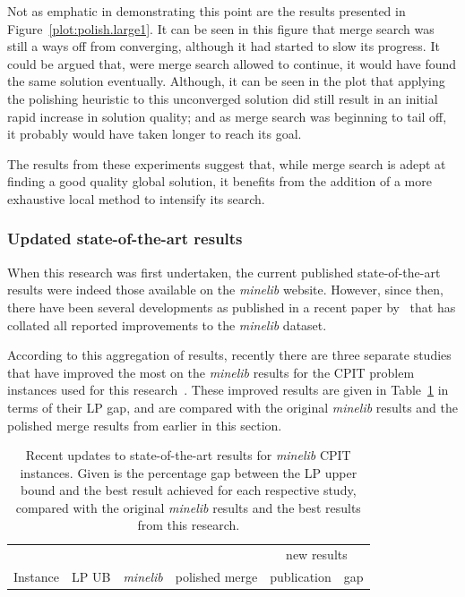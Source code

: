 \documentclass[authoryear,11pt,square,number,times,super,comma]{elsarticle}
\begin{document}
Not as emphatic in demonstrating this point are the results presented in Figure~\ref{plot:polish.large1}. It can be seen in this figure that merge search was still a ways off from converging, although it had started to slow its progress. It could be argued that, were merge search allowed to continue, it would have found the same solution eventually. Although, it can be seen in the plot that applying the polishing heuristic to this unconverged solution did still result in an initial rapid increase in solution quality; and as merge search was beginning to tail off, it probably would have taken longer to reach its goal.

The results from these experiments suggest that, while merge search is adept at finding a good quality global solution, it benefits from the addition of a more exhaustive local method to intensify its search. 

\subsubsection*{Updated state-of-the-art results}

When this research was first undertaken, the current published state-of-the-art results were indeed those available on the \emph{minelib} website. However, since then, there have been several developments as published in a recent paper by~\cite{minelib-improved} that has collated all reported improvements to the \emph{minelib} dataset.

According to this aggregation of results, recently there are three separate studies that have improved the most on the \emph{minelib} results for the CPIT problem instances used for this research~\citep{newman-improved,zuck-small-improved,JELVEZ20161169}. These improved results are given in Table~\ref{tab:mine:update} in terms of their LP gap, and are compared with the original \emph{minelib} results and the polished merge results from earlier in this section.

\begin{table}[h!]
\centering
\caption[Recent updates to state-of-the-art results for \emph{minelib} CPIT instances]{Recent updates to state-of-the-art results for \emph{minelib} CPIT instances. Given is the percentage gap between the LP upper bound and the best result achieved for each respective study, compared with the original \emph{minelib} results and the best results from this research.}\label{tab:mine:update}
\begin{adjustbox}{width=0.6\textwidth}
\begin{tabular}{lrrrrr} \toprule
& & & & \multicolumn{2}{c}{new results}\\ 
\cmidrule(lr){5-6}
Instance & \multicolumn{1}{c}{LP UB} & \multicolumn{1}{c}{\emph{minelib}} & \multicolumn{1}{c}{polished merge} & \multicolumn{1}{c}{publication} & \multicolumn{1}{c}{gap}\\ 
\midrule
%

%
\bottomrule
\end{tabular}
\end{adjustbox}
\end{table}
\end{document}
